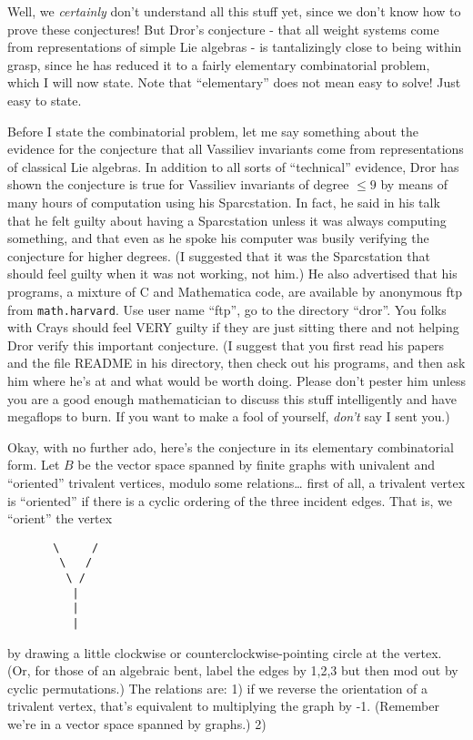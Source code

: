 \documentclass{article}
\begin{document}
Well, we \emph{certainly} don't understand all this stuff yet, since we
don't know how to prove these conjectures! But Dror's conjecture - that
all weight systems come from representations of simple Lie algebras - is
tantalizingly close to being within grasp, since he has reduced it to a
fairly elementary combinatorial problem, which I will now state. Note
that ``elementary'' does not mean easy to solve! Just easy to state.

Before I state the combinatorial problem, let me say something about the
evidence for the conjecture that all Vassiliev invariants come from
representations of classical Lie algebras. In addition to all sorts of
``technical'' evidence, Dror has shown the conjecture is true for
Vassiliev invariants of degree \(\leqslant 9\) by means of many hours of
computation using his Sparcstation. In fact, he said in his talk that he
felt guilty about having a Sparcstation unless it was always computing
something, and that even as he spoke his computer was busily verifying
the conjecture for higher degrees. (I suggested that it was the
Sparcstation that should feel guilty when it was not working, not him.)
He also advertised that his programs, a mixture of C and Mathematica
code, are available by anonymous ftp from \texttt{math.harvard}. Use
user name ``ftp'', go to the directory ``dror''. You folks with Crays
should feel VERY guilty if they are just sitting there and not helping
Dror verify this important conjecture. (I suggest that you first read
his papers and the file README in his directory, then check out his
programs, and then ask him where he's at and what would be worth doing.
Please don't pester him unless you are a good enough mathematician to
discuss this stuff intelligently and have megaflops to burn. If you want
to make a fool of yourself, \emph{don't} say I sent you.)

Okay, with no further ado, here's the conjecture in its elementary
combinatorial form. Let \(B\) be the vector space spanned by finite
graphs with univalent and ``oriented'' trivalent vertices, modulo some
relations\ldots{} first of all, a trivalent vertex is ``oriented'' if
there is a cyclic ordering of the three incident edges. That is, we
``orient'' the vertex

\begin{verbatim}
       \     /
        \   /
         \ /
          |
          |
          |
\end{verbatim}

by drawing a little clockwise or counterclockwise-pointing circle at the
vertex. (Or, for those of an algebraic bent, label the edges by 1,2,3
but then mod out by cyclic permutations.) The relations are: 1) if we
reverse the orientation of a trivalent vertex, that's equivalent to
multiplying the graph by -1. (Remember we're in a vector space spanned
by graphs.) 2)
\end{document}
